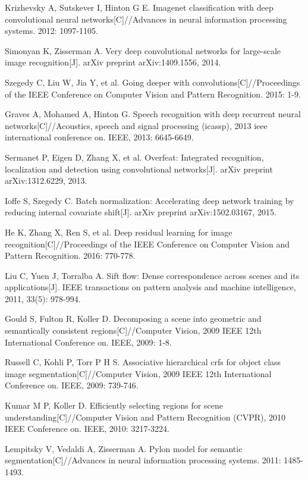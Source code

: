 \documentclass[10.5pt,compsoc]{TsT}
\theoremstyle{mystyle}
\begin{document}
{\begin{thebibliography}{99}
Krizhevsky A, Sutskever I, Hinton G E. Imagenet classification with deep convolutional neural networks[C]//Advances in neural information processing systems. 2012: 1097-1105.

Simonyan K, Zisserman A. Very deep convolutional networks for large-scale image recognition[J]. arXiv preprint arXiv:1409.1556, 2014.

Szegedy C, Liu W, Jia Y, et al. Going deeper with convolutions[C]//Proceedings of the IEEE Conference on Computer Vision and Pattern Recognition. 2015: 1-9.

Graves A, Mohamed A, Hinton G. Speech recognition with deep recurrent neural networks[C]//Acoustics, speech and signal processing (icassp), 2013 ieee international conference on. IEEE, 2013: 6645-6649.

Sermanet P, Eigen D, Zhang X, et al. Overfeat: Integrated recognition, localization and detection using convolutional networks[J]. arXiv preprint arXiv:1312.6229, 2013.

Ioffe S, Szegedy C. Batch normalization: Accelerating deep network training by reducing internal covariate shift[J]. arXiv preprint arXiv:1502.03167, 2015.

He K, Zhang X, Ren S, et al. Deep residual learning for image recognition[C]//Proceedings of the IEEE Conference on Computer Vision and Pattern Recognition. 2016: 770-778.

Liu C, Yuen J, Torralba A. Sift flow: Dense correspondence across scenes and its applications[J]. IEEE transactions on pattern analysis and machine intelligence, 2011, 33(5): 978-994.

Gould S, Fulton R, Koller D. Decomposing a scene into geometric and semantically consistent regions[C]//Computer Vision, 2009 IEEE 12th International Conference on. IEEE, 2009: 1-8.


Russell C, Kohli P, Torr P H S. Associative hierarchical crfs for object class image segmentation[C]//Computer Vision, 2009 IEEE 12th International Conference on. IEEE, 2009: 739-746.

Kumar M P, Koller D. Efficiently selecting regions for scene understanding[C]//Computer Vision and Pattern Recognition (CVPR), 2010 IEEE Conference on. IEEE, 2010: 3217-3224.

Lempitsky V, Vedaldi A, Zisserman A. Pylon model for semantic segmentation[C]//Advances in neural information processing systems. 2011: 1485-1493.


\end{thebibliography}}
\end{document}
